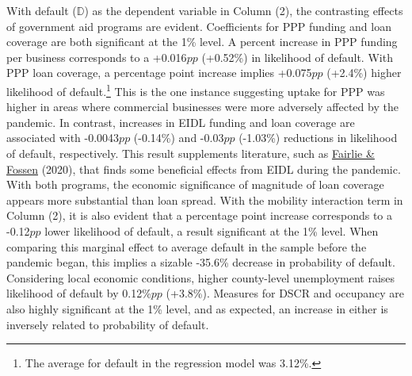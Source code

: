 \documentclass[11pt]{article} %
\begin{document}
With default ($\mathbb{D}$) as the dependent variable in Column (2), the contrasting effects of government aid programs are evident. Coefficients for PPP funding and loan coverage are both significant at the 1\% level. A percent increase in PPP funding per business corresponds to a +0.016\hspace{0.20em}$pp$ (+0.52\%) in likelihood of default. With PPP loan coverage, a percentage point increase implies +0.075\hspace{0.20em}$pp$ (+2.4\%) higher likelihood of default.\footnote{The average for default in the regression model was 3.12\%.} This is the one instance suggesting uptake for PPP was higher in areas where commercial businesses were more adversely affected by the pandemic. In contrast, increases in EIDL funding and loan coverage are associated with -0.0043\hspace{0.20em}$pp$ (-0.14\%) and -0.03\hspace{0.20em}$pp$ (-1.03\%) reductions in likelihood of default, respectively. This result supplements literature, such as \hyperlink{Fairlie}{Fairlie \& Fossen} (2020), that finds some beneficial effects from EIDL during the pandemic. With both programs, the economic significance of magnitude of loan coverage appears more substantial than loan spread. With the mobility interaction term in Column (2), it is also evident that a percentage point increase corresponds to a -0.12\hspace{0.20em}$pp$ lower likelihood of default, a result significant at the 1\% level. When comparing this marginal effect to average default in the sample before the pandemic began, this implies a sizable -35.6\% decrease in probability of default. Considering local economic conditions, higher county-level unemployment raises likelihood of default by 0.12\%\hspace{0.20em}$pp$ (+3.8\%). Measures for DSCR and occupancy are also highly significant at the 1\% level, and as expected, an increase in either is inversely related to probability of default. 
\end{document}
